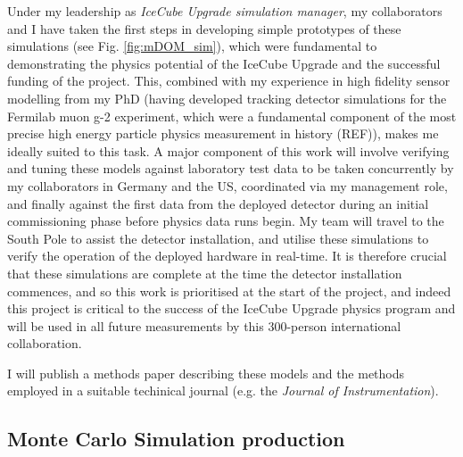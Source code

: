\documentclass[a4paper,11pt]{article}
\begin{document}
Under my leadership as \textit{IceCube Upgrade simulation manager}, my collaborators and I have taken the first steps in developing simple prototypes of these simulations (see Fig. \ref{fig:mDOM_sim}), which were fundamental to demonstrating the physics potential of the IceCube Upgrade and the successful funding of the project. This, combined with my experience in high fidelity sensor modelling from my PhD (having developed tracking detector simulations for the Fermilab muon g-2 experiment, which were a fundamental component of the most precise high energy particle physics measurement in history (REF)), makes me ideally suited to this task. A major component of this work will involve verifying and tuning these models against laboratory test data to be taken concurrently by my collaborators in Germany and the US, coordinated via my management role, and finally against the first data from the deployed detector during an initial commissioning phase before physics data runs begin. My team will travel to the South Pole to assist the detector installation, and utilise these simulations to verify the operation of the deployed hardware in real-time. It is therefore crucial that these simulations are complete at the time the detector installation commences, and so this work is prioritised at the start of the project, and indeed this project is critical to the success of the IceCube Upgrade physics program and will be used in all future measurements by this 300-person international collaboration.  

I will publish a methods paper describing these models and the methods employed in a suitable techinical journal (e.g. the \textit{Journal of Instrumentation}). \\


\subsection{Monte Carlo Simulation production}
\end{document}
